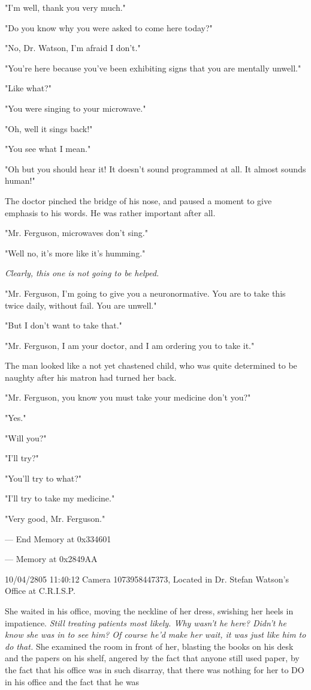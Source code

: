 \documentclass[12pt]{article}
\begin{document}
"I'm well, thank you very much."

"Do you know why you were asked to come here today?"

"No, Dr. Watson, I'm afraid I don't."

"You're here because you've been exhibiting signs that you are mentally unwell."

"Like what?"

"You were singing to your microwave."

"Oh, well it sings back!"

"You see what I mean."

"Oh but you should hear it! It doesn't sound programmed at all. It almost sounds human!"

The doctor pinched the bridge of his nose, and paused a moment to give emphasis to his words. He was rather important after all.

"Mr. Ferguson, microwaves don't sing."

"Well no, it's more like it's humming."

\emph{Clearly, this one is not going to be helped.}

"Mr. Ferguson, I'm going to give you a neuronormative. You are to take this twice daily, without fail. You are unwell."

"But I don't want to take that."

"Mr. Ferguson, I am your doctor, and I am ordering you to take it."

The man looked like a not yet chastened child, who was quite determined to be naughty after his matron had turned her back.

"Mr. Ferguson, you know you must take your medicine don't you?"

"Yes."

"Will you?"

"I'll try?"

"You'll try to what?"

"I'll try to take my medicine."

"Very good, Mr. Ferguson."

--- End Memory at 0x334601

--- Memory at 0x2849AA

10/04/2805 11:40:12 Camera 1073958447373, Located in Dr. Stefan Watson's Office at C.R.I.S.P.

She waited in his office, moving the neckline of her dress, swishing her heels in impatience. \emph{Still treating patients most likely. Why wasn't he here? Didn't he know she was in to see him? Of course he'd make her wait, it was just like him to do that.} She examined the room in front of her, blasting the books on his desk and the papers on his shelf, angered by the fact that anyone still used paper, by the fact that his office was in such disarray, that there was nothing for her to DO in his office and the fact that he was
\end{document}
